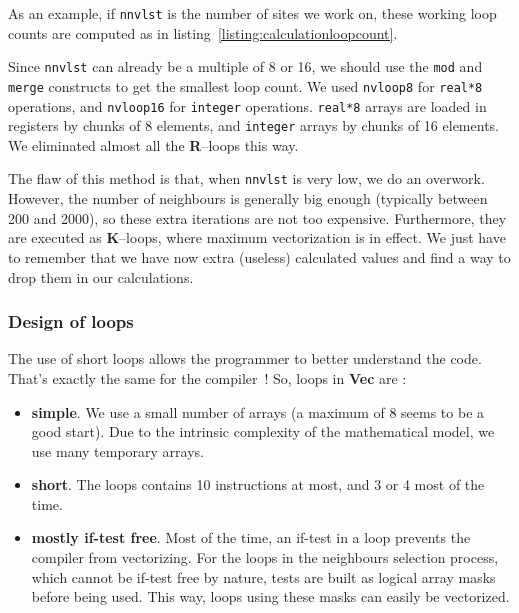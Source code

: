 \documentclass[9pt,comparison]{livecoms}
\newcommand{\lv}{\Large\verb}
\begin{document}
As an example, if {\color{blue}\lv|nnvlst|} is the number of sites we work on, these working loop counts are computed as in listing~\ref{listing:calculationloopcount}.


Since {\color{blue}\lv|nnvlst|} can already be a multiple of 8 or 16, we should use the {\color{blue}\lv|mod|} and {\color{blue}\lv|merge|} constructs to get the smallest loop count. We used {\color{blue}\lv|nvloop8|} for {\color{codegreen}\lv|real*8|} operations, and {\color{blue}\lv|nvloop16|} for {\color{codegreen}\lv|integer|} operations. {\color{codegreen}\lv|real*8|} arrays are loaded in registers by chunks of 8 elements, and {\color{codegreen}\lv|integer|} arrays by chunks of 16 elements. We eliminated almost all the \textbf{R}--loops this way.

The flaw of this method is that, when {\color{blue}\lv|nnvlst|} is very low, we do an overwork. However, the number of neighbours is generally big enough (typically between 200 and 2000), so these extra iterations are not too expensive. Furthermore, they are executed as \textbf{K}--loops, where maximum vectorization is in effect. We just have to remember that we have now extra (useless) calculated values and find a way to drop them in our calculations.

\subsubsection{Design of loops}
\hspace{\parindent}The use of short loops allows the programmer to better understand the code. That's exactly the same for the compiler~! So, loops in \textbf{Vec} are :
\begin{itemize}
    \item \textbf{simple}. We use a small number of arrays (a maximum of 8 seems to be a good start). Due to the intrinsic complexity of the mathematical model, we use many temporary arrays.
    \item \textbf{short}. The loops contains 10 instructions at most, and 3 or 4 most of the time. 
    \item \textbf{mostly if-test free}. Most of the time, an  if-test in a loop prevents the compiler from vectorizing. For the loops in the neighbours selection process, which cannot be if-test free by nature, tests are built as logical array masks before being used. This way, loops using these masks can easily be vectorized.
\end{itemize}
\end{document}
